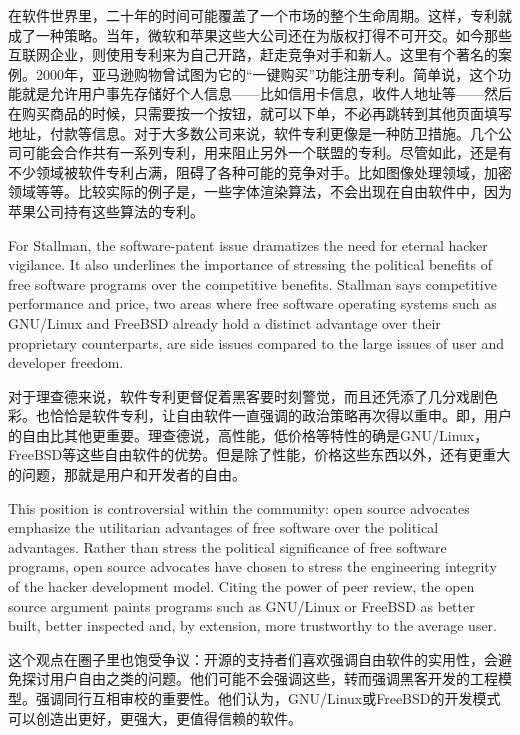 \ifdefined\chs
在软件世界里，二十年的时间可能覆盖了一个市场的整个生命周期。这样，专利就成了一种策略。当年，微软和苹果这些大公司还在为版权打得不可开交。如今那些互联网企业，则使用专利来为自己开路，赶走竞争对手和新人。这里有个著名的案例。2000年，亚马逊购物曾试图为它的“一键购买”功能注册专利。简单说，这个功能就是允许用户事先存储好个人信息——比如信用卡信息，收件人地址等——然后在购买商品的时候，只需要按一个按钮，就可以下单，不必再跳转到其他页面填写地址，付款等信息。对于大多数公司来说，软件专利更像是一种防卫措施。几个公司可能会合作共有一系列专利，用来阻止另外一个联盟的专利。尽管如此，还是有不少领域被软件专利占满，阻碍了各种可能的竞争对手。比如图像处理领域，加密领域等等。比较实际的例子是，一些字体渲染算法，不会出现在自由软件中，因为苹果公司持有这些算法的专利。
\fi

\ifdefined\eng
For Stallman, the software-patent issue dramatizes the need for eternal hacker vigilance. It also underlines the importance of stressing the political benefits of free software programs over the competitive benefits. Stallman says competitive performance and price, two areas where free software operating systems such as GNU/Linux and FreeBSD already hold a distinct advantage over their proprietary counterparts, are side issues compared to the large issues of user and developer freedom.
\fi

\ifdefined\chs
对于理查德来说，软件专利更督促着黑客要时刻警觉，而且还凭添了几分戏剧色彩。也恰恰是软件专利，让自由软件一直强调的政治策略再次得以重申。即，用户的自由比其他更重要。理查德说，高性能，低价格等特性的确是GNU/Linux，FreeBSD等这些自由软件的优势。但是除了性能，价格这些东西以外，还有更重大的问题，那就是用户和开发者的自由。
\fi

\ifdefined\eng
This position is controversial within the community: open source advocates emphasize the utilitarian advantages of free software over the political advantages. Rather than stress the political significance of free software programs, open source advocates have chosen to stress the engineering integrity of the hacker development model. Citing the power of peer review, the open source argument paints programs such as GNU/Linux or FreeBSD as better built, better inspected and, by extension, more trustworthy to the average user.
\fi

\ifdefined\chs
这个观点在圈子里也饱受争议：开源的支持者们喜欢强调自由软件的实用性，会避免探讨用户自由之类的问题。他们可能不会强调这些，转而强调黑客开发的工程模型。强调同行互相审校的重要性。他们认为，GNU/Linux或FreeBSD的开发模式可以创造出更好，更强大，更值得信赖的软件。
\fi

